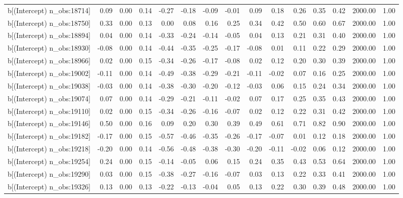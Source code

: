 \begin{table}[ht]
\begin{tabular}{rrrrrrrrrrrrrrr}
  b[(Intercept) n\_obs:18714] & 0.09 & 0.00 & 0.14 & -0.27 & -0.18 & -0.09 & -0.01 & 0.09 & 0.18 & 0.26 & 0.35 & 0.42 & 2000.00 & 1.00 \\ 
  b[(Intercept) n\_obs:18750] & 0.33 & 0.00 & 0.13 & 0.00 & 0.08 & 0.16 & 0.25 & 0.34 & 0.42 & 0.50 & 0.60 & 0.67 & 2000.00 & 1.00 \\ 
  b[(Intercept) n\_obs:18894] & 0.04 & 0.00 & 0.14 & -0.33 & -0.24 & -0.14 & -0.05 & 0.04 & 0.13 & 0.21 & 0.31 & 0.40 & 2000.00 & 1.00 \\ 
  b[(Intercept) n\_obs:18930] & -0.08 & 0.00 & 0.14 & -0.44 & -0.35 & -0.25 & -0.17 & -0.08 & 0.01 & 0.11 & 0.22 & 0.29 & 2000.00 & 1.00 \\ 
  b[(Intercept) n\_obs:18966] & 0.02 & 0.00 & 0.15 & -0.34 & -0.26 & -0.17 & -0.08 & 0.02 & 0.12 & 0.20 & 0.30 & 0.39 & 2000.00 & 1.00 \\ 
  b[(Intercept) n\_obs:19002] & -0.11 & 0.00 & 0.14 & -0.49 & -0.38 & -0.29 & -0.21 & -0.11 & -0.02 & 0.07 & 0.16 & 0.25 & 2000.00 & 1.00 \\ 
  b[(Intercept) n\_obs:19038] & -0.03 & 0.00 & 0.14 & -0.38 & -0.30 & -0.20 & -0.12 & -0.03 & 0.06 & 0.15 & 0.24 & 0.34 & 2000.00 & 1.00 \\ 
  b[(Intercept) n\_obs:19074] & 0.07 & 0.00 & 0.14 & -0.29 & -0.21 & -0.11 & -0.02 & 0.07 & 0.17 & 0.25 & 0.35 & 0.43 & 2000.00 & 1.00 \\ 
  b[(Intercept) n\_obs:19110] & 0.02 & 0.00 & 0.15 & -0.34 & -0.26 & -0.16 & -0.07 & 0.02 & 0.12 & 0.22 & 0.31 & 0.42 & 2000.00 & 1.00 \\ 
  b[(Intercept) n\_obs:19146] & 0.50 & 0.00 & 0.16 & 0.09 & 0.20 & 0.30 & 0.39 & 0.49 & 0.61 & 0.71 & 0.82 & 0.90 & 2000.00 & 1.00 \\ 
  b[(Intercept) n\_obs:19182] & -0.17 & 0.00 & 0.15 & -0.57 & -0.46 & -0.35 & -0.26 & -0.17 & -0.07 & 0.01 & 0.12 & 0.18 & 2000.00 & 1.00 \\ 
  b[(Intercept) n\_obs:19218] & -0.20 & 0.00 & 0.14 & -0.56 & -0.48 & -0.38 & -0.30 & -0.20 & -0.11 & -0.02 & 0.06 & 0.12 & 2000.00 & 1.00 \\ 
  b[(Intercept) n\_obs:19254] & 0.24 & 0.00 & 0.15 & -0.14 & -0.05 & 0.06 & 0.15 & 0.24 & 0.35 & 0.43 & 0.53 & 0.64 & 2000.00 & 1.00 \\ 
  b[(Intercept) n\_obs:19290] & 0.03 & 0.00 & 0.15 & -0.38 & -0.27 & -0.16 & -0.07 & 0.03 & 0.13 & 0.22 & 0.33 & 0.41 & 2000.00 & 1.00 \\ 
  b[(Intercept) n\_obs:19326] & 0.13 & 0.00 & 0.13 & -0.22 & -0.13 & -0.04 & 0.05 & 0.13 & 0.22 & 0.30 & 0.39 & 0.48 & 2000.00 & 1.00 \\ 

\end{tabular}
\end{table}
